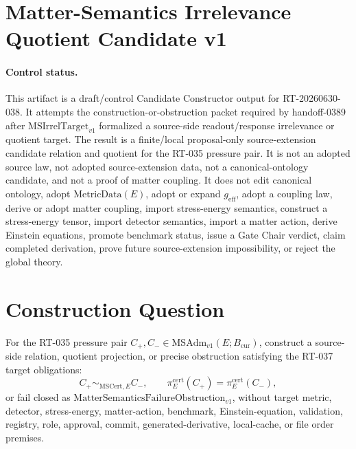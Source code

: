 \section*{Matter-Semantics Irrelevance Quotient Candidate v1}

\paragraph{Control status.}
This artifact is a draft/control Candidate Constructor output for
RT-20260630-038.  It attempts the construction-or-obstruction packet required
by handoff-0389 after \(\mathrm{MSIrrelTarget}_{v1}\) formalized a
source-side readout/response irrelevance or quotient target.  The result is a
finite/local proposal-only source-extension candidate relation and quotient
for the RT-035 pressure pair.  It is not an adopted source law, not adopted
source-extension data, not a canonical-ontology candidate, and not a proof of
matter coupling.  It does not edit canonical ontology, adopt
\(\mathrm{MetricData}(E)\), adopt or expand \(g_{\mathrm{eff}}\), adopt a
coupling law, derive or adopt matter coupling, import stress-energy
semantics, construct a stress-energy tensor, import detector semantics,
import a matter action, derive Einstein equations, promote benchmark status,
issue a Gate Chair verdict, claim completed derivation, prove future
source-extension impossibility, or reject the global theory.

\newcommand{\Bcur}{B_{\mathrm{cur}}}
\newcommand{\MSAdm}{\mathrm{MSAdm}_{v1}}
\newcommand{\MSIrrel}{\mathrm{MSIrrelLaw}_{v1}}
\newcommand{\MSQuot}{\mathrm{MSSemanticsQuotient}_{v1}}
\newcommand{\MSCertEq}{\sim_{\mathrm{MSCert},E}}
\newcommand{\MSCertQuot}{\mathrm{MSCertFiberQuot}_{v1}}
\newcommand{\MSFail}{\mathrm{MatterSemanticsFailureObstruction}_{v1}}
\newcommand{\NoTarget}{\mathrm{NoTargetImport}_{v1}}
\newcommand{\NoDetector}{\mathrm{NoDetectorImport}_{v1}}
\newcommand{\NoSE}{\mathrm{NoStressEnergyImport}_{v1}}
\newcommand{\NoAction}{\mathrm{NoMatterActionImport}_{v1}}

\newtheorem{definition}{Definition}
\newtheorem{proposition}{Proposition}

\section{Construction Question}

For the RT-035 pressure pair \(C_+,C_-\in \MSAdm(E;\Bcur)\), construct a
source-side relation, quotient projection, or precise obstruction satisfying
the RT-037 target obligations:
\[
  C_+ \mathrel{\MSCertEq} C_-,
  \qquad
  \pi^{\mathrm{cert}}_E(C_+)=\pi^{\mathrm{cert}}_E(C_-),
\]
or fail closed as \(\MSFail\), without target metric, detector,
stress-energy, matter-action, benchmark, Einstein-equation, validation,
registry, role, approval, commit, generated-derivative, local-cache, or file
order premises.

